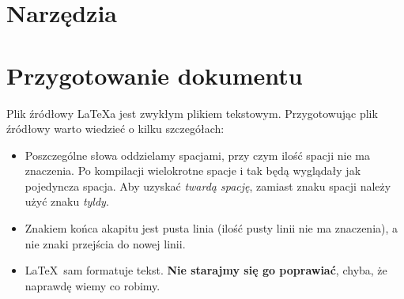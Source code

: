 
\section{Narzędzia}
\label{sec:narzedzia}



\section{Przygotowanie dokumentu}
\label{sec:przygotowanieDokumentu}

Plik źródłowy \LaTeX a jest zwykłym plikiem tekstowym. Przygotowując plik
źródłowy warto wiedzieć o kilku szczegółach:

\begin{itemize}
\item
Poszczególne słowa oddzielamy spacjami, przy czym ilość spacji nie ma znaczenia.
Po kompilacji wielokrotne spacje i tak będą wyglądały jak pojedyncza spacja.
Aby uzyskać {\em twardą spację}, zamiast znaku spacji należy użyć znaku {\em
tyldy}.

\item
Znakiem końca akapitu jest pusta linia (ilość pusty linii nie ma znaczenia), a
nie znaki przejścia do nowej linii.

\item
\LaTeX~sam formatuje tekst. \textbf{Nie starajmy się go poprawiać}, chyba, że
naprawdę wiemy co robimy.
\end{itemize} 


